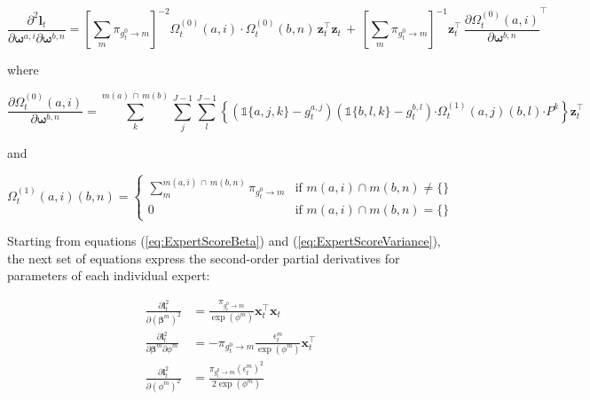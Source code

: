 \documentclass[12pt]{article}
\newcommand{\bw}[1]{\boldsymbol{\omega}^{#1}}
\newcommand{\gateprod}[2]{\pi_{#1 \longrightarrow #2}}
\newcommand{\FnOmegaNaught}[2]{\Omega^{(0)}_{t}( #1, #2 )}
\newcommand{\FnOmegaOne}[4]{\Omega^{(1)}_{t}(#1, #2)(#3, #4)}
\begin{document}
\begin{equation} \label{eq:nodehessian}
  \frac{\partial^{2} \boldsymbol{l}_{t}}{\partial \boldsymbol{\omega}^{a, i} \partial \boldsymbol{\omega}^{b,n}} = \left[ \sum_{m} \gateprod{g^{0}_{t}}{m} \right]^{-2} \FnOmegaNaught{a}{i} \cdot \FnOmegaNaught{b}{n} \, \boldsymbol{z}^{\top}_{t} \boldsymbol{z}_{t} \, + \, \left[ \sum_{m} \gateprod{g^{0}_{t}}{m} \right]^{-1} \boldsymbol{z}^{\top}_{t} \, \frac{ \partial \FnOmegaNaught{a}{i} }{\partial \bw{b, n}}^{\top}
\end{equation}

where

\begin{equation}
  \frac{ \partial \FnOmegaNaught{a}{i} }{\partial \boldsymbol{\omega}^{b, n}} = \sum_{k}^{m(a) \, \cap \, m(b) } \sum_{j}^{J - 1} \sum_{l}^{J - 1} \left\{ \left( \mathbb{1}\{a, j, k\} - g^{a,j}_{t} \right) \left( \mathbb{1}\{b, l, k\} - g^{b,l}_{t} \right) \boldsymbol{\cdot} \FnOmegaOne{a}{j}{b}{l} \boldsymbol{\cdot} P^{k} \right\}  \boldsymbol{z}^{\top}_{t}
\end{equation}

and

\begin{equation} \label{eq:ExpertIntersection}
  \FnOmegaOne{a}{i}{b}{n} = \begin{cases} 
    \sum_{m}^{m(a,i) \, \cap \, m(b, n)}  \gateprod{g^{0}_{t}}{m}  & \textrm{if $m(a,i) \cap m(b, n) \neq \{ \}$} \\
     0 & \textrm{if $m(a,i) \cap m(b, n) = \{ \}$}
             \end{cases}
\end{equation}

Starting from equations (\ref{eq:ExpertScoreBeta}) and (\ref{eq:ExpertScoreVariance}),
the next set of equations express the second-order partial derivatives for parameters
of each individual expert:

\begin{align}
  \frac{\partial \boldsymbol{l}^{2}_{t}}{\partial (\boldsymbol{\beta}^{m})^{2}} &= \frac{ \gateprod{g^{0}_{t}}{m} }{ \exp{(\phi^{m})} } \boldsymbol{x}_{t}^{\top} \boldsymbol{x}_{t} \\
  \frac{\partial \boldsymbol{l}^{2}_{t}}{\partial \boldsymbol{\beta}^{m} \partial \phi^{m}} &= - \gateprod{g^{0}_{t}}{m} \frac{ \epsilon^{m}_{t} }{\exp{(\phi^{m})}} \boldsymbol{x}_{t}^{\top} \\
  \frac{\partial \boldsymbol{l}^{2}_{t}}{\partial (\phi^{m})^{2}} &= \frac{ \gateprod{g^{0}_{t}}{m} (\epsilon^{m}_{t})^{2} }{ 2 \exp{(\phi^{m})} }
\end{align}
\end{document}
